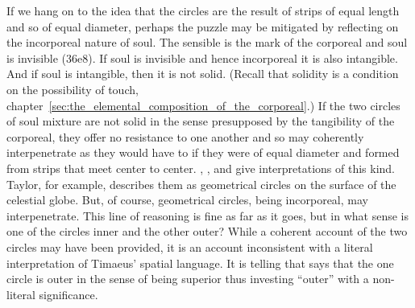 If we hang on to the idea that the circles are the result of strips of equal length and so of equal diameter, perhaps the puzzle may be mitigated by reflecting on the incorporeal nature of soul. The sensible is the mark of the corporeal and soul is invisible (36e8). If soul is invisible and hence incorporeal it is also intangible. And if soul is intangible, then it is not solid. (Recall that solidity is a condition on the possibility of touch, chapter~\ref{sec:the_elemental_composition_of_the_corporeal}.) If the two circles of soul mixture are not solid in the sense presupposed by the tangibility of the corporeal, they offer no resistance to one another and so may coherently interpenetrate as they would have to if they were of equal diameter and formed from strips that meet center to center. \citet[111--2 n7]{Archer-Hind:1888qd}, \citet[148]{Taylor:1928qb}, and \citet[120--1]{Dicks:1970aa} give interpretations of this kind. Taylor, for example, describes them as geometrical circles on the surface of the celestial globe. But, of course, geometrical circles, being incorporeal, may interpenetrate. This line of reasoning is fine as far as it goes, but in what sense is one of the circles inner and the other outer? While a coherent account of the two circles may have been provided, it is an account inconsistent with a literal interpretation of Timaeus' spatial language. It is telling that \citet[112 n3]{Archer-Hind:1888qd} says that the one circle is outer in the sense of being superior thus investing ``outer'' with a non-literal significance.

